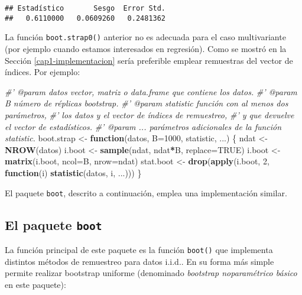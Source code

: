 \documentclass[
]{book}
\newenvironment{Shaded}{\begin{snugshade}}{\end{snugshade}}
\newcommand{\CommentTok}[1]{\textcolor[rgb]{0.56,0.35,0.01}{\textit{#1}}}
\newcommand{\ControlFlowTok}[1]{\textcolor[rgb]{0.13,0.29,0.53}{\textbf{#1}}}
\newcommand{\DataTypeTok}[1]{\textcolor[rgb]{0.13,0.29,0.53}{#1}}
\newcommand{\DecValTok}[1]{\textcolor[rgb]{0.00,0.00,0.81}{#1}}
\newcommand{\KeywordTok}[1]{\textcolor[rgb]{0.13,0.29,0.53}{\textbf{#1}}}
\newcommand{\NormalTok}[1]{#1}
\newcommand{\OperatorTok}[1]{\textcolor[rgb]{0.81,0.36,0.00}{\textbf{#1}}}
\newcommand{\OtherTok}[1]{\textcolor[rgb]{0.56,0.35,0.01}{#1}}
\newcommand{\StringTok}[1]{\textcolor[rgb]{0.31,0.60,0.02}{#1}}
\theoremstyle{definition}
\theoremstyle{definition}
\theoremstyle{definition}
\theoremstyle{remark}
\begin{document}
\begin{verbatim}
## Estadístico       Sesgo  Error Std. 
##   0.6110000   0.0609260   0.2481362
\end{verbatim}

La función \texttt{boot.strap0()} anterior no es adecuada para el caso multivariante
(por ejemplo cuando estamos interesados en regresión).
Como se mostró en la Sección \ref{cap1-implementacion}
sería preferible emplear remuestras del vector de índices. Por ejemplo:

\begin{Shaded}
\begin{Highlighting}[]
\CommentTok{#' @param datos vector, matriz o data.frame que contiene los datos.}
\CommentTok{#' @param B número de réplicas bootstrap.}
\CommentTok{#' @param statistic función con al menos dos parámetros, }
\CommentTok{#' los datos y el vector de índices de remuestreo, }
\CommentTok{#' y que devuelve el vector de estadísticos.}
\CommentTok{#' @param ... parámetros adicionales de la función statistic.}
\NormalTok{boot.strap <-}\StringTok{ }\ControlFlowTok{function}\NormalTok{(datos, }\DataTypeTok{B=}\DecValTok{1000}\NormalTok{, statistic, ...) \{}
\NormalTok{  ndat <-}\StringTok{ }\KeywordTok{NROW}\NormalTok{(datos)}
\NormalTok{  i.boot <-}\StringTok{ }\KeywordTok{sample}\NormalTok{(ndat, ndat}\OperatorTok{*}\NormalTok{B, }\DataTypeTok{replace=}\OtherTok{TRUE}\NormalTok{)}
\NormalTok{  i.boot <-}\StringTok{ }\KeywordTok{matrix}\NormalTok{(i.boot, }\DataTypeTok{ncol=}\NormalTok{B, }\DataTypeTok{nrow=}\NormalTok{ndat)}
\NormalTok{  stat.boot <-}\StringTok{ }\KeywordTok{drop}\NormalTok{(}\KeywordTok{apply}\NormalTok{(i.boot, }\DecValTok{2}\NormalTok{, }\ControlFlowTok{function}\NormalTok{(i) }\KeywordTok{statistic}\NormalTok{(datos, i, ...)))}
\NormalTok{\}}
\end{Highlighting}
\end{Shaded}

El paquete \texttt{boot}, descrito a continuación, emplea una implementación similar.

\hypertarget{cap1-pkgboot}{%
\subsection{\texorpdfstring{El paquete \texttt{boot}}{El paquete boot}}\label{cap1-pkgboot}}

La función principal de este paquete es la función \texttt{boot()} que implementa
distintos métodos de remuestreo para datos i.i.d..
En su forma más simple permite realizar bootstrap uniforme
(denominado \emph{bootstrap noparamétrico básico} en este paquete):
\end{document}
